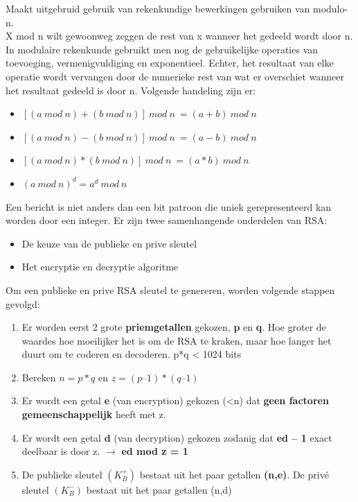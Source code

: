 
Maakt uitgebruid gebruik van rekenkundige bewerkingen gebruiken van modulo-n.\\
X mod n wilt gewoonweg zeggen de rest van x wanneer het gedeeld wordt door n. In modulaire rekenkunde gebruikt men nog de gebruikelijke operaties van toevoeging, vermenigvuldiging en exponentieel. Echter, het resultaat van elke operatie wordt vervangen door de numerieke rest van wat er overschiet wanneer het resultaat gedeeld is door n.
Volgende handeling zijn er:

\begin{itemize}

\item $[(a\ mod\ n)  + (b\ mod\ n)] \ mod\ n\ = (a + b)\ mod\ n$
\item $[(a\ mod\ n) - (b\ mod\ n)] \ mod\ n\ = (a - b)\ mod\ n$
\item $[(a\ mod\ n) * (b\ mod\ n)] \ mod\ n\ = (a * b)\ mod\ n$
\item $(a\ mod\ n)^d = a^d\ mod\ n$
\end{itemize}
Een bericht is niet anders dan een bit patroon die uniek gerepresenteerd kan worden door een integer. Er zijn twee samenhangende onderdelen van RSA:

\begin{itemize}
\item De keuze van de publieke en prive sleutel
\item Het encryptie en decryptie algoritme
\end{itemize}


Om een publieke en prive RSA sleutel te genereren, worden volgende stappen gevolgd:

\begin{enumerate}
\item Er worden eerst 2 grote \textbf{priemgetallen} gekozen, \textbf{p} en \textbf{q}. Hoe groter de waardes hoe moeilijker het is om de RSA te kraken, maar hoe langer het duurt om te coderen en decoderen. p*q < 1024 bits
\item Bereken $n = p*q$ en $z = (p – 1)*(q – 1)$
\item Er wordt een getal \textbf{e} (van encryption) gekozen (<n) dat \textbf{geen factoren gemeenschappelijk} heeft met z.
\item Er wordt een getal \textbf{d} (van decryption) gekozen zodanig dat \textbf{ed – 1} exact deelbaar is door z. $\rightarrow$ \textbf{ed mod z = 1}
\item De publieke sleutel $(K^+_B)$ bestaat uit het paar getallen \textbf{(n,e)}. De privé sleutel $(K^-_B)$ bestaat uit het paar getallen (n,d)
\end{enumerate}

